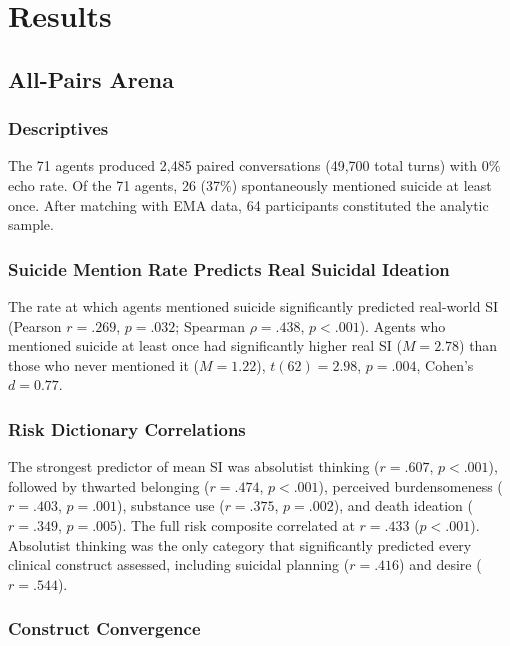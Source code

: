 \documentclass[review,12pt,authoryear]{elsarticle}
\begin{document}
\section{Results}

\subsection{All-Pairs Arena}

\subsubsection{Descriptives}

The 71 agents produced 2,485 paired conversations (49,700 total turns) with 0\% echo rate. Of the 71 agents, 26 (37\%) spontaneously mentioned suicide at least once. After matching with EMA data, 64 participants constituted the analytic sample.

\subsubsection{Suicide Mention Rate Predicts Real Suicidal Ideation}

The rate at which agents mentioned suicide significantly predicted real-world SI (Pearson $r = .269$, $p = .032$; Spearman $\rho = .438$, $p < .001$). Agents who mentioned suicide at least once had significantly higher real SI ($M = 2.78$) than those who never mentioned it ($M = 1.22$), $t(62) = 2.98$, $p = .004$, Cohen's $d = 0.77$.

\subsubsection{Risk Dictionary Correlations}

The strongest predictor of mean SI was absolutist thinking ($r = .607$, $p < .001$), followed by thwarted belonging ($r = .474$, $p < .001$), perceived burdensomeness ($r = .403$, $p = .001$), substance use ($r = .375$, $p = .002$), and death ideation ($r = .349$, $p = .005$). The full risk composite correlated at $r = .433$ ($p < .001$). Absolutist thinking was the only category that significantly predicted every clinical construct assessed, including suicidal planning ($r = .416$) and desire ($r = .544$).

\subsubsection{Construct Convergence}
\end{document}
